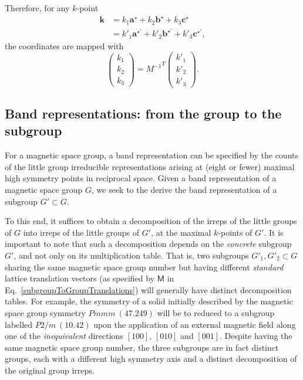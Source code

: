 \documentclass[12pt, a4paper]{article}
\begin{document}
Therefore, for any $k$-point
\begin{align}
  \bm{k}&=k_1\bm{a}^{\star}+k_2\bm{b}^{\star}+k_3\bm{c}^{\star}\\
  &=k'_1\bm{a}^{\star\prime}+k'_2\bm{b}^{\star\prime}+k'_3\bm{c}^{\star\prime},
\end{align} 
the coordinates are mapped with
\begin{equation}
  \begin{pmatrix}
    k_1\\
    k_2\\
    k_3
  \end{pmatrix}
  =
  {M^{-1}}^{T}
  \begin{pmatrix}
    k'_1\\
    k'_2\\
    k'_3
  \end{pmatrix}.
\end{equation} 

\subsection{Band representations: from the group to the subgroup}
For a magnetic space group, a band representation can be specified by the counts of the little group irreducible representations arising at (eight or fewer) maximal high symmetry points in reciprocal space. Given a band representation of a magnetic space group $G$, we seek to the derive the band representation of a subgroup $G'\subset G$.

To this end, it suffices to obtain a decomposition of the irreps of the little groups of $G$ into irreps of the little groups of $G'$, at the maximal $k$-points of $G'$. It is important to note that such a decomposition depends on the \emph{concrete} subgroup $G'$, and not only on its multiplication table. That is, two subgroups $G'_1,G'_2\subset G$ sharing the same magnetic space group number but having different \emph{standard} lattice translation vectors (as specified by $\mathsf{M}$ in Eq.~\ref{subgroupToGroupTranslations}) will generally have distinct decomposition tables. For example, the symmetry of a solid initially described by the magnetic space group symmetry $Pmmm~(47.249)$ will be to reduced to a subgroup labelled $P2/m~(10.42)$ upon the application of an external magnetic field along one of the \emph{inequivalent} directions $[100]$, $[010]$ and $[001]$. Despite having the same magnetic space group number, the three subgroups are in fact distinct groups, each with a different high symmetry axis and a distinct decomposition of the original group irreps.
\end{document}
